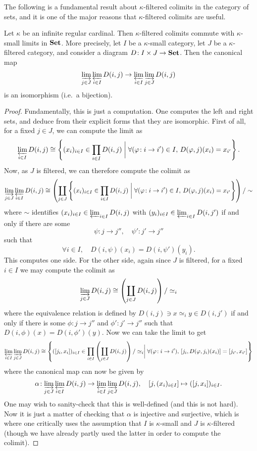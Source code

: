 The following is a fundamental result about \(\kappa\)-filtered colimits in the category of sets, and it is one of the major reasons that \(\kappa\)-filtered colimits
are useful.
\begin{theorem}\label{thm:filtered-colimits-commute-with-finite-limits-in-set}
	Let \(\kappa\) be an infinite regular cardinal. Then \(\kappa\)-filtered colimits commute with \(\kappa\)-small limits in \(\Set\). More precisely, let \(I\) be a \(\kappa\)-small category, let \( J\) be a \(\kappa\)-filtered category, and
	consider a diagram \(D\!: I\times J\to\Set\). Then the canonical map
	\[ \injlim_{j\in J}\projlim_{i\in I} D(i,j) \to \projlim_{i\in I}\injlim_{j\in J} D(i,j) \]
	is an isomorphism (i.e.\ a bijection).
\end{theorem}
\begin{proof}
Fundamentally, this is just a computation. One computes the left and right sets, and deduce from their explicit forms that they are isomorphic. First of all, for a fixed \(j\in J\),
we can compute the limit as
\[ \projlim_{i\in I}D(i,j) \cong \left\{(x_i)_{i\in I}\in\prod_{i\in I}D(i,j) \bigmid \forall(\varphi\!:i\to i')\in I,\, D(\varphi,j)(x_i) = x_{i'} \right\}. \]
Now, as \(J\) is filtered, we can therefore compute the colimit as
\[ \injlim_{j\in J}\projlim_{i\in I}D(i,j) \cong \left(\coprod_{j\in J}\left\{(x_i)_{i\in I}\in\prod_{i\in I}D(i,j) \bigmid \forall(\varphi\!:i\to i')\in I,\, D(\varphi,j)(x_i) = x_{i'} \right\}\right)/\sim \]
where \(\sim\) identifies \((x_{i})_{i\in I}\in\projlim_{i\in I}D(i,j)\) with \((y_i)_{i\in I}\in\projlim_{i\in I}D(i,j')\) if and only if there are some
\[ \psi\!:j\to j'',\quad\psi'\!:j'\to j''\]
such that
\[ \forall i\in I,\quad D(i,\psi)(x_i) = D(i,\psi')(y_i). \]
This computes one side. For the other side, again since \(J\) is filtered, for a fixed \(i\in I\) we may compute the colimit as
\[ \injlim_{j\in J}D(i,j) \cong \left(\coprod_{j\in J}D(i,j)\right)/\simeq_i \]
where the equivalence relation is defined by \(D(i,j)\ni x \simeq_i y\in D(i,j')\) if and only if there is some \(\phi\!:j\to j''\) and \(\phi'\!:j'\to j''\) such that \( D(i,\phi)(x) = D(i,\phi')(y). \)
Now we can take the limit to get
\[ \projlim_{i\in I}\injlim_{j\in J}D(i,j) \cong \left\{ ([j_i,x_i])_{i\in I} \in\prod_{i\in I} \left(\coprod_{j\in J}D(i,j)\right)/\simeq_i \bigmid \forall(\varphi\!:i\to i'),\, [j_i,D(\varphi,j_i)(x_i)] = [j_{i'},x_{i'}] \right\} \]
where the canonical map can now be given by
\[ \alpha\!:\injlim_{j\in J}\projlim_{i\in I}D(i,j) \to \projlim_{i\in I}\injlim_{j\in J}D(i,j),\quad [j,(x_i)_{i\in I}] \mapsto ([j,x_i])_{i\in I}. \]
One may wish to sanity-check that this is well-defined (and this is not hard). Now it is just a matter of checking that \(\alpha\) is injective and surjective, which
is where one critically uses the assumption that \(I\) is \(\kappa\)-small and \(J\) is \(\kappa\)-filtered (though we have already partly used the latter in order to compute the colimit).


\end{proof}

